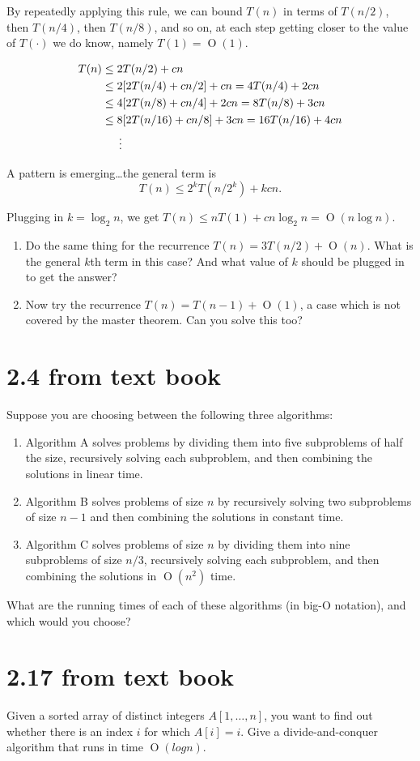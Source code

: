 \documentclass[12pt]{article}
\newcommand{\BigO}[1]{\ensuremath{\operatorname{O}\left(#1\right)}}
\begin{document}
By repeatedly applying this rule, we can bound $T(n)$ in terms of $T(n/2)$,
then $T(n/4)$, then $T(n/8)$, and so on, at each step getting closer to
the value of $T(\cdot)$ we do know,
namely $T(1) = \BigO{1}$.

\begin{align*}
T (n) &\leq 2T (n/2) + cn \\
&\leq 2[2T(n/4) + cn/2] + cn = 4T(n/4) + 2cn \\
&\leq 4[2T(n/8) + cn/4] + 2cn = 8T(n/8) + 3cn \\
&\leq 8[2T(n/16) + cn/8] + 3cn = 16T(n/16) + 4cn \\
&\indent \vdots
\end{align*}

A pattern is emerging\ldots the general term is 
\[T(n) \leq 2^kT(n/2^k) + kcn.\]

Plugging in $k = \log_2{n}$, we get $T(n) \leq nT(1) + cn\log_2{n} = \BigO{n\log{n}}.$
\begin{enumerate}
\item Do the same thing for the recurrence $T(n) = 3T(n/2) + \BigO{n}$. What
is the general $k$th term
in this case? And what value of $k$ should be plugged in to get the
answer?

\item Now try the recurrence $T(n) = T( n −1 ) + \BigO{1}$, a case which is not
covered by the master theorem. Can you solve this too?
\end{enumerate}

\section*{2.4 from text book}
Suppose you are choosing between the following three algorithms:

\begin{enumerate}
\item Algorithm A solves problems by dividing them into five subproblems
of half the size, recursively solving each subproblem, and then
combining the solutions in linear time.

\item Algorithm B solves problems of size $n$ by recursively solving two
subproblems of size $n − 1$ and then combining the solutions in constant
time.

\item Algorithm C solves problems of size $n$ by dividing them into nine
subproblems of size $n/3$, recursively solving each subproblem, and then
combining the solutions in $\BigO{n^2}$ time.
\end{enumerate}

\noindent What are the running times of each of these algorithms (in big-O
notation), and which would you choose?

\section*{2.17 from text book}

Given a sorted array of distinct integers $A[1, \dots , n]$, you want to
find out whether there is an index $i$ for which $A[i] = i$. Give a
divide-and-conquer algorithm that runs in time $\BigO{log n}$.
\end{document}
